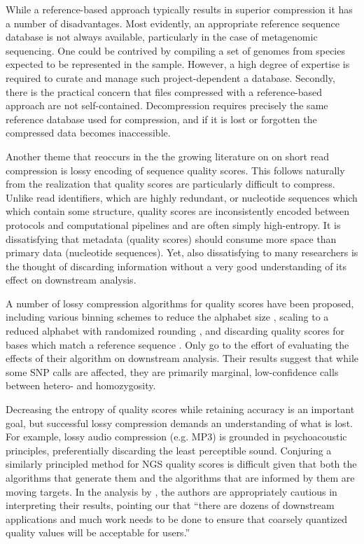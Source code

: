 \documentclass[twocolumn]{article}
\begin{document}
While a reference-based approach typically results in superior compression it
has a number of disadvantages. Most evidently, an appropriate reference
sequence database is not always available, particularly in the case of metagenomic
sequencing. One could be contrived by compiling a set of genomes from species
expected to be represented in the sample. However, a high degree of expertise
is required to curate and manage such project-dependent a database. Secondly,
there is the practical concern that files compressed with a reference-based
approach are not self-contained. Decompression requires precisely the same
reference database used for compression, and if it is lost or forgotten the
compressed data becomes inaccessible.



Another theme that reoccurs in the the growing literature on on short read
compression is lossy encoding of sequence quality scores. This follows
naturally from the realization that quality scores are particularly difficult
to compress. Unlike read identifiers, which are highly redundant, or
nucleotide sequences which which contain some structure, quality scores are
inconsistently encoded between protocols and computational pipelines and are
often simply high-entropy. It is dissatisfying that metadata (quality scores)
should consume more space than primary data (nucleotide sequences). Yet, also
dissatisfying to many researchers is the thought of discarding information
without a very good understanding of its effect on downstream analysis.

A number of lossy compression algorithms for quality scores have been
proposed, including various binning schemes to reduce the alphabet size
\citep{Wan2011}, scaling to a reduced alphabet with randomized rounding
\citep{Kozanitis2011}, and discarding quality scores for bases which match a
reference sequence \citep{Hsi-YangFritz2011}. Only \citet{Kozanitis2011} go to
the effort of evaluating the effects of their algorithm on downstream
analysis. Their results suggest that while some SNP calls are affected, they
are primarily marginal, low-confidence calls between hetero- and homozygosity.

Decreasing the entropy of quality scores while retaining accuracy is an
important goal, but successful lossy compression demands an understanding of
what is lost. For example, lossy audio compression (e.g. MP3) is grounded in
psychoacoustic principles, preferentially discarding the least perceptible
sound. Conjuring a similarly principled method for NGS quality scores is
difficult given that both the algorithms that generate them and the algorithms
that are informed by them are moving targets. In the analysis by
\citet{Kozanitis2011}, the authors are appropriately cautious in interpreting
their results, pointing our that ``there are dozens of downstream applications
and much work needs to be done to ensure that coarsely quantized quality
values will be acceptable for users.''
\end{document}
